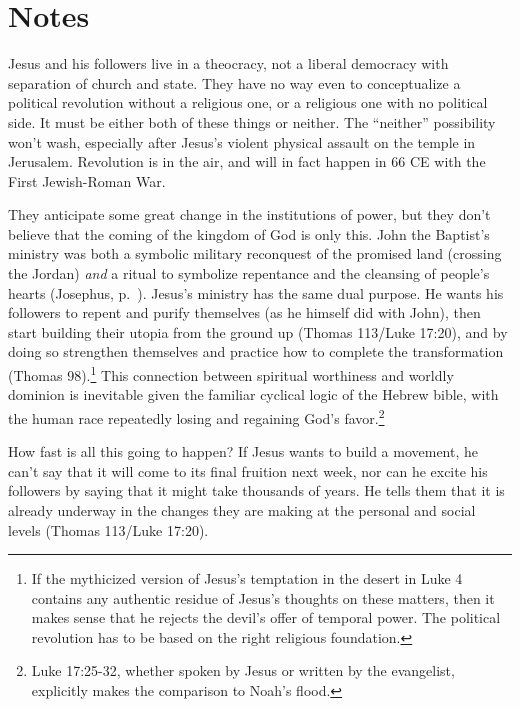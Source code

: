 \documentclass[10pt,twoside]{article} %
\newcommand{\quotesize}{\normalsize{}}
\newcommand{\maintextquotesize}{\renewcommand{\quotesize}{\large{}}}
\newcommand{\notequotesize}{\renewcommand{\quotesize}{\normalsize{}}}
\newcommand{\intex}[1]{\index[texts]{#1}}
\newcommand{\reftex}[1]{#1\intex{#1}}
\newenvironment{notesection}[1]{
  \setcounter{secnumdepth}{0}          %
  \section*{#1}
  \setcounter{secnumdepth}{2}          %
  \notequotesize
}%
{
  \maintextquotesize
}
\begin{document}
\begin{notesection}{Notes}
Jesus and his followers live in a theocracy, not a liberal democracy with separation of church and state.
They have no way even to conceptualize a political revolution without a religious one, or
a religious one with no political side. It must be either both of these things or neither.
The ``neither'' possibility won't wash, especially after Jesus's violent physical assault on
the temple in Jerusalem.
Revolution is in the air, and will in fact happen in 66 CE with the First Jewish-Roman War.

They anticipate some great change in the institutions of power, but they don't believe
that the coming of the kingdom of God is only this. John the Baptist's ministry was both
a symbolic military reconquest of the promised land (crossing the Jordan) \emph{and}
a ritual to symbolize repentance and the cleansing of people's hearts (Josephus, p.~\pageref{josephus-baptism}).
Jesus's ministry has the same dual purpose.
He wants his followers to repent and purify themselves (as he himself did with John), then
start building their utopia from the ground up (Thomas 113/Luke 17:20), and
by doing so strengthen themselves and practice how to complete the transformation (Thomas 98).\footnote{If the
mythicized version of Jesus's temptation in the desert in Luke 4 contains any authentic residue of Jesus's
thoughts on these matters, then it makes sense that he rejects the devil's offer of temporal power. The political revolution
has to be based on the right religious foundation.}
This connection between spiritual worthiness and worldly dominion is inevitable given the
familiar cyclical logic of the Hebrew bible, with the human race repeatedly losing and
regaining God's favor.\footnote{\reftex{Luke 17:25-32}, whether spoken by Jesus or written by the evangelist,
explicitly makes the comparison to Noah's flood.}

How fast is all this going to happen? If Jesus wants to build a movement, he can't say that
it will come to its final fruition next week, nor can he excite his followers by saying that
it might take thousands of years. He tells them that it is already underway in the changes
they are making at the personal and social levels (Thomas 113/Luke 17:20).


\end{notesection}
\end{document}
